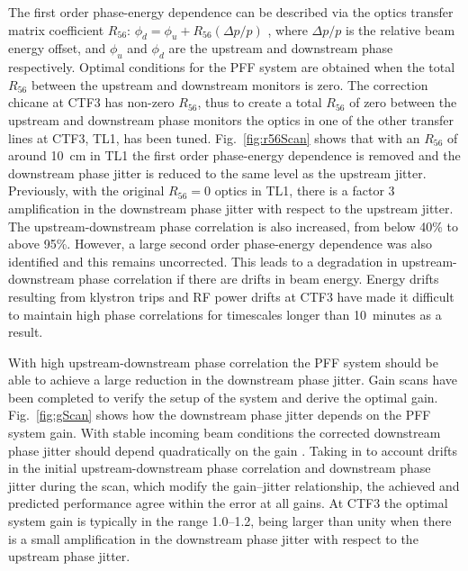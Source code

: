 \documentclass[%
 reprint,
superscriptaddress,
 amsmath,amssymb,
 prl,
]{revtex4-1}
\begin{document}
The first order phase-energy dependence can be described via the optics 
transfer matrix coefficient \(R_{56}\):
\(\phi_d = \phi_u + R_{56}(\Delta p / p)\)
, where \(\Delta p / p\) is the relative beam energy offset, and \(\phi_u\) and 
\(\phi_d\) are the upstream and downstream phase respectively.
Optimal conditions for the PFF system are obtained when the total \(R_{56}\) 
between the upstream and downstream monitors is zero.
The correction chicane at CTF3 has non-zero \(R_{56}\), thus to create a total 
\(R_{56}\) of zero between the upstream and downstream phase monitors the 
optics in one of the other transfer lines at CTF3, TL1, has been tuned.
Fig.~\ref{fig:r56Scan} shows that with an \(R_{56}\) of around 10~cm in TL1 the 
first order phase-energy dependence is removed and the 
downstream phase jitter is reduced to the same level as the upstream jitter. 
Previously, with the original \(R_{56}=0\) optics in TL1, there is a factor 3 
amplification in the downstream phase jitter with respect to the upstream 
jitter. The upstream-downstream phase correlation is also increased, from below 
40\% to above 95\%. However, a large second order phase-energy dependence was 
also identified and 
this remains uncorrected. This leads to a degradation in upstream-downstream 
phase correlation if there are drifts in beam energy. Energy drifts resulting 
from klystron trips and RF power drifts at CTF3 have made it difficult to 
maintain high phase correlations for timescales longer than 10~minutes as a 
result.

With high upstream-downstream phase correlation the PFF system should be able 
to achieve a large reduction in the downstream phase jitter. Gain scans have 
been completed to verify the setup of the system and derive the optimal gain.
Fig.~\ref{fig:gScan} shows how the downstream phase jitter depends on the PFF 
system gain. With stable incoming beam conditions the corrected downstream 
phase jitter 
should depend quadratically on the gain \cite{RobertsThesis}. Taking in to 
account drifts in the initial upstream-downstream phase correlation and 
downstream phase jitter during the scan, which modify the gain--jitter 
relationship, the achieved and predicted performance agree within the error at 
all gains. At CTF3 the optimal system gain is typically in the range 1.0--1.2, 
being larger than unity when there is a small amplification in the downstream 
phase jitter with respect to the upstream phase jitter.
\end{document}
